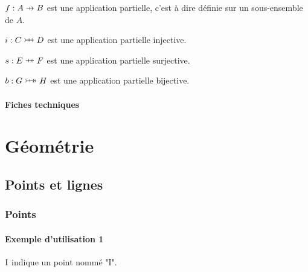 \documentclass[12pt,a4paper]{article}
\theoremstyle{definition}
\begin{document}
\begin{tcblisting}{}
$f: A \pto B$ est une application partielle, c'est à dire définie sur un sous-ensemble
de $A$.

$i: C \ponetoone D$ est une application partielle injective.

$s: E \ponto F$ est une application partielle surjective.

$b: G \pbiject H$ est une application partielle bijective.
\end{tcblisting}



\paragraph{Fiches techniques}

\begin{multicols}{2}
    
    
    
    
    
    
    
\end{multicols}



\section{Géométrie}

\subsection{Points et lignes}

\subsubsection{Points}

\paragraph{Exemple d'utilisation 1}

\begin{tcblisting}{}
$\pt{I}$ indique un point nommé "I".
\end{tcblisting}
\end{document}
